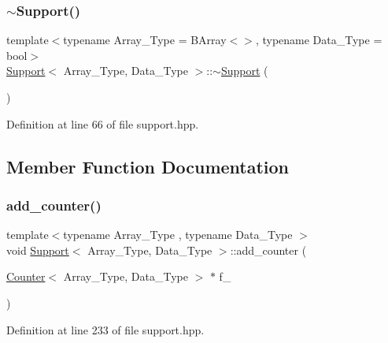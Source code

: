 \subsubsection{\texorpdfstring{$\sim$\+Support()}{~Support()}}
{\footnotesize\ttfamily template$<$typename Array\+\_\+\+Type = B\+Array$<$$>$, typename Data\+\_\+\+Type = bool$>$ \\
\hyperlink{class_support}{Support}$<$ Array\+\_\+\+Type, Data\+\_\+\+Type $>$\+::$\sim$\hyperlink{class_support}{Support} (\begin{DoxyParamCaption}{ }\end{DoxyParamCaption})\hspace{0.3cm}{\ttfamily [inline]}}



Definition at line 66 of file support.\+hpp.



\subsection{Member Function Documentation}
\mbox{\label{class_support_a0ad8bb6202451253697d771a28859210}} 
\subsubsection{\texorpdfstring{add\+\_\+counter()}{add\_counter()}\hspace{0.1cm}{\footnotesize\ttfamily [1/2]}}
{\footnotesize\ttfamily template$<$typename Array\+\_\+\+Type , typename Data\+\_\+\+Type $>$ \\
void \hyperlink{class_support}{Support}$<$ Array\+\_\+\+Type, Data\+\_\+\+Type $>$\+::add\+\_\+counter (\begin{DoxyParamCaption}\item[{\hyperlink{class_counter}{Counter}$<$ Array\+\_\+\+Type, Data\+\_\+\+Type $>$ $\ast$}]{f\+\_\+ }\end{DoxyParamCaption})\hspace{0.3cm}{\ttfamily [inline]}}



Definition at line 233 of file support.\+hpp.

\mbox{\label{class_support_aa8680937a0237286a8b0401bca07cbf6}} 
